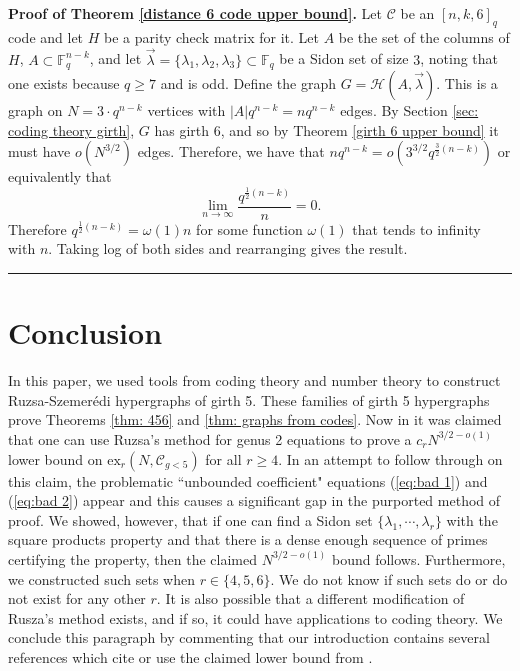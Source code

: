\documentclass[12pt]{article}%
\newenvironment{proof}[1][Proof]{\noindent\textbf{#1.} }
{\hfill \ \rule{0.5em}{0.5em}}
\begin{document}
\begin{proof}[Proof of Theorem \ref{distance 6 code upper bound}]
    Let $\mathcal{C}$ be an $[n,k,6]_q$ code and let $H$ be a parity check matrix for it. Let $A$ be the set of the columns of $H$, $A\subset \mathbb{F}_q^{n-k}$, and let $\vec{\lambda}=\{\lambda_1 ,\lambda_2, \lambda_3\}\subset \mathbb{F}_q$ be a Sidon set of size $3$, noting that one exists because $q\geq 7$ and is odd. Define the graph $G=\mathcal{H}(A,\vec{\lambda})$. This is a graph on $N = 3\cdot q^{n-k}$ vertices with $|A|q^{n-k} = n q^{n-k}$ edges. By Section \ref{sec: coding theory girth}, $G$ has girth $6$, and so by Theorem \ref{girth 6 upper bound} it must have $o(N^{3/2})$ edges. Therefore, we have that 
    $nq^{n-k} = o\left( 3^{3/2}q^{\frac{3}{2}(n-k)}\right)$
    or equivalently that 
    \[
    \lim_{n\to \infty } \frac{q^{\frac{1}{2}(n-k)}}{n} = 0.
    \]
    Therefore $q^{\frac{1}{2}(n-k)} = \omega(1)n$ for some function $\omega(1)$ that tends to infinity with $n$. Taking log of both sides and rearranging gives the result. 
\end{proof}

\section{Conclusion}\label{sec:conclusion}

{ In this paper, we used tools from coding theory and number theory to construct Ruzsa-Szemer\'{e}di hypergraphs of girth 5.  These families of girth 5 hypergraphs prove Theorems \ref{thm: 456} and \ref{thm: graphs from codes}.  Now in \cite{TV} it was claimed that one can use Ruzsa's method for genus 2 equations to prove a $c_rN^{3/2 - o (1) }$ lower bound on $\textrm{ex}_r(N , \mathcal{C}_{g  < 5} )$ for all $r \geq 4$.  In an attempt to follow through on this claim, the problematic ``unbounded coefficient" equations 
(\ref{eq:bad 1}) and (\ref{eq:bad 2}) appear and this causes a significant gap in the purported method of proof.  We showed, however, that if one can find a Sidon set $\{\lambda_1,\cdots, \lambda_r\}$ with the square products property and that there is a dense enough sequence of primes certifying the property, then the claimed $N^{3/2-o(1)}$ bound follows. Furthermore, we constructed such sets when $r\in \{4,5,6\}$. We do not know if such sets do or do not exist for any other $r$.  It is also possible that a different modification of Rusza's method exists, and if so, it could have applications to coding theory.  We conclude this paragraph by commenting that our introduction contains several references which cite or use the claimed lower bound from \cite{TV}.}  
\end{document}
